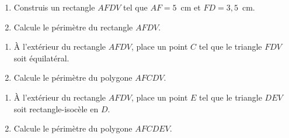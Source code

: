 \begin{myenumerate}
  \item
    \begin{enumerate}
    \item Construis un rectangle $AFDV$ tel que $AF=5$~cm et $FD=3,5$~cm.
    \item Calcule le périmètre du rectangle $AFDV$.
    \end{enumerate}
  \item 
    \begin{enumerate}
    \item \`A l'extérieur du rectangle $AFDV$, place un point $C$ tel que le triangle $FDV$ soit équilatéral.
    \item Calcule le périmètre du polygone $AFCDV$.
    \end{enumerate}
  \item 
    \begin{enumerate}
    \item \`A l'extérieur du rectangle $AFDV$, place un point $E$ tel que le triangle $DEV$ soit rectangle-isocèle en $D$.
    \item Calcule le périmètre du polygone $AFCDEV$.
    \end{enumerate}
\end{myenumerate}